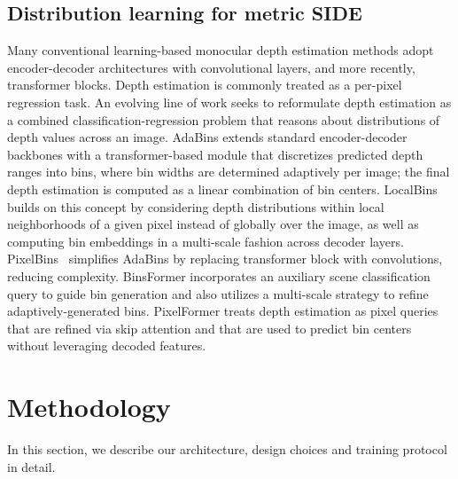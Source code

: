 \documentclass[10pt,twocolumn,letterpaper]{article}
\begin{document}
\subsection{Distribution learning for metric SIDE}
Many conventional learning-based monocular depth estimation methods adopt encoder-decoder architectures with convolutional layers, and more recently, transformer blocks. Depth estimation is commonly treated as a per-pixel regression task. An evolving line of work seeks to reformulate depth estimation as a combined classification-regression problem that reasons about distributions of depth values across an image. AdaBins \cite{bhat2021adabins} extends standard encoder-decoder backbones with a transformer-based module that discretizes predicted depth ranges into bins, where bin widths are determined adaptively per image; the final depth estimation is computed as a linear combination of bin centers. LocalBins \cite{bhat2022localbins} builds on this concept by considering depth distributions within local neighborhoods of a given pixel instead of globally over the image, as well as computing bin embeddings in a multi-scale fashion across decoder layers. PixelBins~\cite{pixelbinsSarwari:EECS-2021-32} simplifies AdaBins by replacing transformer block with convolutions, reducing complexity. BinsFormer \cite{li2022binsformer} incorporates an auxiliary scene classification query to guide bin generation and also utilizes a multi-scale strategy to refine adaptively-generated bins. PixelFormer \cite{agarwal2022attention} treats depth estimation as pixel queries that are refined via skip attention and that are used to predict bin centers without leveraging decoded features. 


\section{Methodology}
\label{sec:methodology}
In this section, we describe our architecture, design choices and training protocol in detail.
\end{document}
